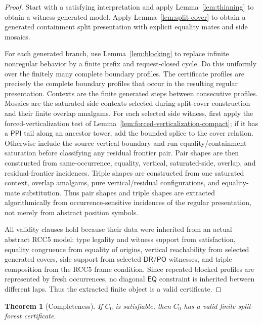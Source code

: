 \documentclass[11pt]{article}
\newtheorem{theorem}{Theorem}[section]
\newcommand{\EQ}{\mathsf{EQ}}
\newcommand{\PPI}{\mathsf{PPI}}
\newcommand{\PO}{\mathsf{PO}}
\newcommand{\DR}{\mathsf{DR}}
\begin{document}
\begin{proof}
Start with a satisfying interpretation and apply Lemma~\ref{lem:thinning} to obtain a witness-generated model.  Apply Lemma~\ref{lem:split-cover} to obtain a generated containment split presentation with explicit equality mates and side mosaics.

For each generated branch, use Lemma~\ref{lem:blocking} to replace infinite nonregular behavior by a finite prefix and request-closed cycle.  Do this uniformly over the finitely many complete boundary profiles.  The certificate profiles are precisely the complete boundary profiles that occur in the resulting regular presentation.  Contexts are the finite generated steps between consecutive profiles.  Mosaics are the saturated side contexts selected during split-cover construction and their finite overlap amalgams.  For each selected side witness, first apply the forced-verticalization test of Lemma~\ref{lem:forced-verticalization-compact}; if it has a \(\PPI\) tail along an ancestor tower, add the bounded splice to the cover relation.  Otherwise include the source vertical boundary and run equality/containment saturation before classifying any residual frontier pair.  Pair shapes are then constructed from same-occurrence, equality, vertical, saturated-side, overlap, and residual-frontier incidences.  Triple shapes are constructed from one saturated context, overlap amalgams, pure vertical/residual configurations, and equality-mate substitution.  Thus pair shapes and triple shapes are extracted algorithmically from occurrence-sensitive incidences of the regular presentation, not merely from abstract position symbols.

All validity clauses hold because their data were inherited from an actual abstract RCC5 model: type legality and witness support from satisfaction, equality congruence from equality of origins, vertical reachability from selected generated covers, side support from selected \(\DR/\PO\) witnesses, and triple composition from the RCC5 frame condition.  Since repeated blocked profiles are represented by fresh occurrences, no diagonal \(\EQ\) constraint is inherited between different laps.  Thus the extracted finite object is a valid certificate.
\end{proof}

\begin{theorem}[Completeness]
If \(C_0\) is satisfiable, then \(C_0\) has a valid finite split-forest certificate.
\end{theorem}
\end{document}
